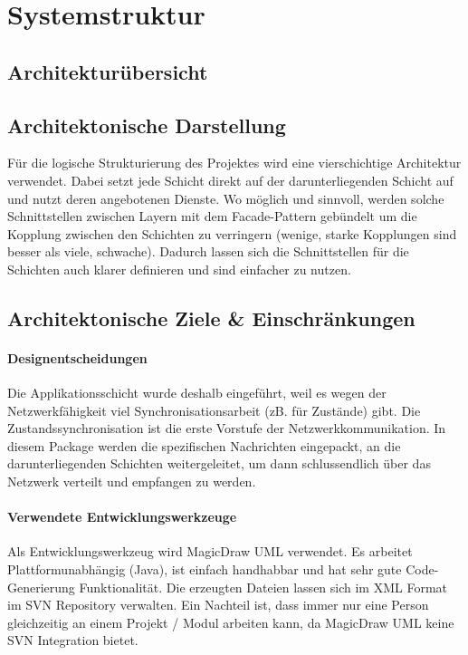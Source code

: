 \documentclass[a4paper,12pt,halfparskip,DIV14]{scrartcl}
\begin{document}


\section{Systemstruktur} %
\label{Systemstruktur}

\subsection{Architekturübersicht} %
\label{sub:architekturuebersicht}
\subsection{Architektonische Darstellung} %
\label{sub:architektonische_darstellung}
Für die logische Strukturierung des Projektes wird eine vierschichtige Architektur verwendet. Dabei setzt jede Schicht direkt auf der darunterliegenden Schicht auf und nutzt deren angebotenen Dienste. Wo möglich und sinnvoll, werden solche Schnittstellen zwischen Layern mit dem Facade-Pattern gebündelt um die Kopplung zwischen den Schichten zu verringern (wenige, starke Kopplungen sind besser als viele, schwache). Dadurch lassen sich die Schnittstellen für die Schichten auch klarer definieren und sind einfacher zu nutzen.

\subsection{Architektonische Ziele \& Einschränkungen} %
\label{sub:architektonische_ziele_einschraenkungen}
\paragraph{Designentscheidungen}\label{ssub:designentscheidungen} %
Die Applikationsschicht wurde deshalb eingeführt, weil es wegen der Netzwerkfähigkeit viel Synchronisationsarbeit (zB. für Zustände) gibt. Die Zustandssynchronisation ist die erste Vorstufe der Netzwerkkommunikation. In diesem Package werden die spezifischen Nachrichten eingepackt, an die darunterliegenden Schichten weitergeleitet, um dann schlussendlich über das Netzwerk verteilt und empfangen zu werden.
\paragraph{Verwendete Entwicklungswerkzeuge}\label{ssub:verwendete_entwicklungswerkzeuge} %
Als Entwicklungswerkzeug wird MagicDraw UML verwendet. Es arbeitet Plattformunabhängig (Java), ist einfach handhabbar und hat sehr gute Code-Generierung Funktionalität. Die erzeugten Dateien lassen sich im XML Format im SVN Repository verwalten. Ein Nachteil ist, dass immer nur eine Person gleichzeitig an einem Projekt / Modul arbeiten kann, da MagicDraw UML keine SVN Integration bietet.
\end{document}
